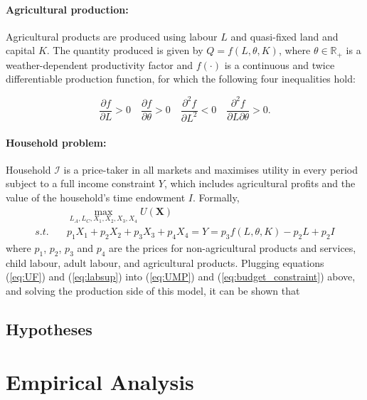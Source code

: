 \documentclass[a4paper,12pt]{article}
\theoremstyle{plain}
\theoremstyle{definition}
\theoremstyle{definition}
\theoremstyle{definition}
\theoremstyle{definition}
\begin{document}
\paragraph{Agricultural production:}
Agricultural products are produced using labour $L$ and quasi-fixed land and capital $K$. The quantity produced is given by $Q=f(L,\theta,K)$, where $\theta \in\mathbb{R}_+$ is a weather-dependent productivity factor and $f(\cdot)$ is a continuous and twice differentiable production function, for which the following four inequalities hold:

$$\frac{\partial f}{\partial L}>0 \quad \frac{\partial f}{\partial \theta}>0 \quad \frac{\partial^2 f}{\partial L^2}<0 \quad \frac{\partial^2 f}{\partial L \partial \theta}>0.$$

\paragraph{Household problem:}

Household $\mathcal{I}$ is a price-taker in all markets and maximises utility in every period subject to a full income constraint $Y$, which includes agricultural profits and the value of the household's time endowment $I$. Formally,
\begin{align}
\label{eq:UMP}
    &\max_{L_A, L_C,X_1, X_2, X_3, X_4} U(\mathbf{X})\\ 
\label{eq:budget_constraint}
    s.t.\quad& p_1 X_1 + p_2 X_2 + p_3 X_3 +p_4 X_4 = Y=p_3 f(L,\theta,K)-p_2L+p_2I
\end{align}
where $p_1$, $p_2$, $p_3$ and $p_4$ are the prices for non-agricultural products and services, child labour, adult labour, and agricultural products. Plugging equations (\ref{eq:UF}) and (\ref{eq:labsup}) into (\ref{eq:UMP}) and (\ref{eq:budget_constraint}) above, and solving the production side of this model, it can be shown that





\subsection{Hypotheses}

\section{Empirical Analysis}
\label{sec:empirical_analysis}
\end{document}
